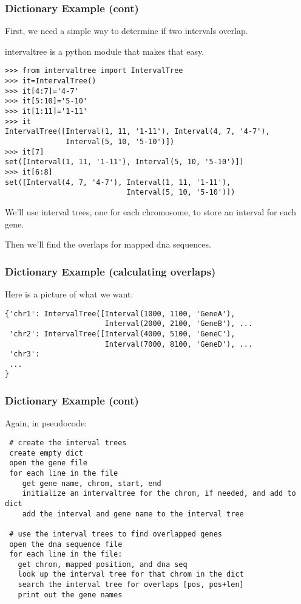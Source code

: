 \documentclass[10pt]{beamer}
\newcommand\smallfont{\fontsize{8pt}{7.2}\selectfont}
\begin{document}
\begin{frame}[fragile]
\frametitle{Dictionary Example (cont)}

First, we need a simple way to determine if two intervals overlap.  
\vspace{2mm}

intervaltree is a python module that makes that easy.

\smallfont
\begin{verbatim}
>>> from intervaltree import IntervalTree
>>> it=IntervalTree()
>>> it[4:7]='4-7'
>>> it[5:10]='5-10'
>>> it[1:11]='1-11'
>>> it
IntervalTree([Interval(1, 11, '1-11'), Interval(4, 7, '4-7'), 
              Interval(5, 10, '5-10')])
>>> it[7]
set([Interval(1, 11, '1-11'), Interval(5, 10, '5-10')])
>>> it[6:8]
set([Interval(4, 7, '4-7'), Interval(1, 11, '1-11'), 
                            Interval(5, 10, '5-10')]) 
\end{verbatim}

We'll use interval trees, one for each chromosome, to store an interval for each gene.
\vspace{2mm}

Then we'll find the overlaps for mapped dna sequences.

\end{frame}

\begin{frame}[fragile]
\frametitle{Dictionary Example (calculating overlaps)}

Here is a picture of what we want:

\smallfont
\begin{verbatim}
{'chr1': IntervalTree([Interval(1000, 1100, 'GeneA'), 
                       Interval(2000, 2100, 'GeneB'), ...
 'chr2': IntervalTree([Interval(4000, 5100, 'GeneC'), 
                       Interval(7000, 8100, 'GeneD'), ...
 'chr3':
 ...
}
\end{verbatim}

\end{frame}


\begin{frame}[fragile]
\frametitle{Dictionary Example (cont)}
\smallfont
Again, in pseudocode:
\begin{verbatim}
 # create the interval trees
 create empty dict
 open the gene file
 for each line in the file
    get gene name, chrom, start, end
    initialize an intervaltree for the chrom, if needed, and add to dict
    add the interval and gene name to the interval tree

 # use the interval trees to find overlapped genes
 open the dna sequence file
 for each line in the file:
   get chrom, mapped position, and dna seq
   look up the interval tree for that chrom in the dict
   search the interval tree for overlaps [pos, pos+len]
   print out the gene names

\end{verbatim}
\end{frame}
\end{document}

